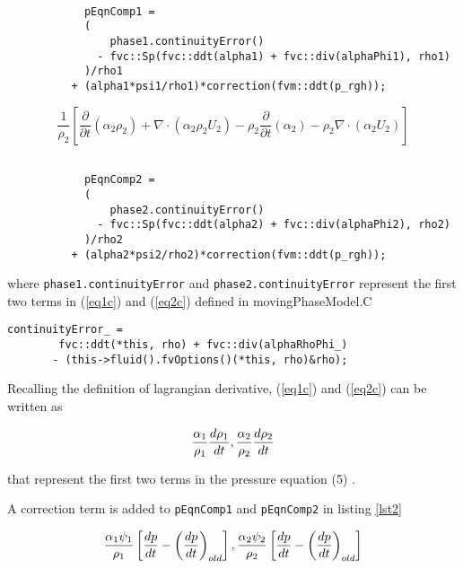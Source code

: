 \documentclass[a4paper, 12 pt, fleqn]{article}
\begin{document}
{\begin{lstlisting}[frame=single] 

            pEqnComp1 =
            (
                phase1.continuityError()
              - fvc::Sp(fvc::ddt(alpha1) + fvc::div(alphaPhi1), rho1)
            )/rho1
          + (alpha1*psi1/rho1)*correction(fvm::ddt(p_rgh));

\end{lstlisting}\label{lst2}

 \begin{equation}\label{eq2c}
\frac{1}{\rho_2}\left[ \frac{\partial}{\partial t}(\alpha_2 \rho_2) +\nabla \cdot\left({\alpha_2 \rho_2 U_2}\right)- \rho_2 \frac{\partial}{\partial t}(\alpha_2) - \rho_2 \nabla \cdot(\alpha_2 U_2) \right]
\end{equation}

\begin{lstlisting}[frame=single] 

            pEqnComp2 =
            (
                phase2.continuityError()
              - fvc::Sp(fvc::ddt(alpha2) + fvc::div(alphaPhi2), rho2)
            )/rho2
          + (alpha2*psi2/rho2)*correction(fvm::ddt(p_rgh));

\end{lstlisting}\label{lst2}

where {\tt phase1.continuityError} and {\tt phase2.continuityError} represent the first two terms in (\ref{eq1c}) and (\ref{eq2c}) defined in movingPhaseModel.C 

\begin{lstlisting}[frame=single] 
 continuityError_ =
        fvc::ddt(*this, rho) + fvc::div(alphaRhoPhi_)
       - (this->fluid().fvOptions()(*this, rho)&rho);
\end{lstlisting}\label{lst3}

Recalling the definition of lagrangian derivative, (\ref{eq1c}) and (\ref{eq2c}) can be written as

\begin{equation}\label{eq3c}
\frac{\alpha_1}{\rho_1} \frac{d\rho_1}{dt},\\
\frac{\alpha_2}{\rho_2} \frac{d\rho_2}{dt}
\end{equation}

that represent the first two terms in the pressure equation (5) .

A correction term is added to {\tt pEqnComp1} and {\tt pEqnComp2} in listing \ref{lst2} 

\begin{equation}\label{eq4c}
\frac{\alpha_1 \psi_1} {\rho_1}\left[ \frac{dp}{dt} - \left( \frac{dp}{dt} \right)_{old} \right], \\
\frac{\alpha_2 \psi_2} {\rho_2}\left[ \frac{dp}{dt} - \left( \frac{dp}{dt} \right)_{old} \right]
\end{equation}

}
\end{document}
